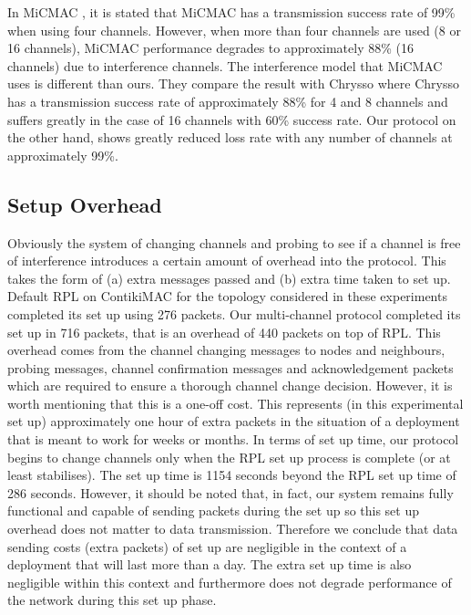 In MiCMAC \cite{micmac}, it is stated that MiCMAC has a transmission success rate of 99\% when using four channels. However, when more than four channels are used (8 or 16 channels), MiCMAC performance degrades to approximately 88\% (16 channels) due to interference channels. The interference model that MiCMAC uses is different than ours. They compare the result with Chrysso where Chrysso has a transmission success rate of approximately 88\% for 4 and 8 channels and suffers greatly in the case of 16 channels with 60\% success rate.
Our protocol on the other hand, shows greatly reduced loss rate with any number of channels at approximately 99\%.

\subsection{Setup Overhead}
Obviously the system of changing channels and probing to see if a channel is free of interference introduces a certain amount of overhead into
the protocol. This takes the form of (a) extra messages passed and (b) extra time taken to set up. Default RPL on ContikiMAC for the topology considered in these experiments completed its set up using 276 packets. Our multi-channel protocol completed its set up in 716 packets, that is an overhead of 440 packets on top of RPL. 
This overhead comes from the channel changing messages to nodes and neighbours, probing messages, channel confirmation messages and acknowledgement packets which are required to ensure a thorough channel change decision.
However, it is worth mentioning that this is a one-off cost. This represents (in this experimental set up) approximately one hour of extra packets in the situation of a deployment that is meant to work for weeks or months.  In terms of set up time, our protocol begins to change channels only when the RPL set up process is complete (or at least stabilises). The set up time is 1154 seconds beyond the RPL set up time of 286 seconds. However, it should be noted that, in fact, our system remains fully functional and capable of sending packets during the set up so this set up overhead does not matter to data transmission.
Therefore we conclude that data sending costs (extra packets) of set up are negligible in the context of a deployment that will last more than a day. The extra set up time is also negligible within this context and furthermore does not degrade performance of the network during this set up phase.